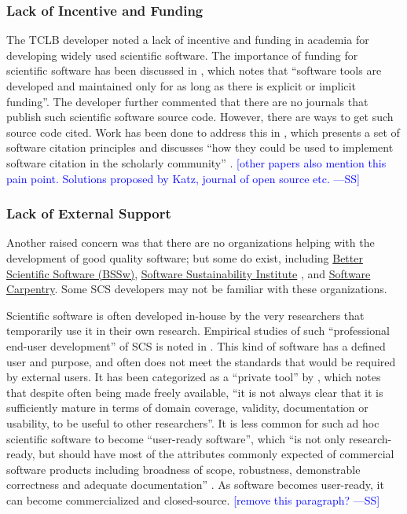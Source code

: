\documentclass[final, 3p, times, authoryear]{elsarticle}
\newcommand{\authornote}[3]{\textcolor{#1}{[#3 ---#2]}}
\newcommand{\authornote}[3]{}
\newcommand{\wss}[1]{\authornote{blue}{SS}{#1}} %
\begin{document}
\subsubsection{Lack of Incentive and Funding}

The TCLB developer noted a lack of incentive and funding in academia for
developing widely used scientific software. The importance of funding for
scientific software has been discussed in \cite{gewaltig2012quality}, which
notes that ``software tools are developed and maintained only for as long as
there is explicit or implicit funding''. The developer further commented that
there are no journals that publish such scientific software source code.
However, there are ways to get such source code cited. Work has been done to
address this in \citep{smith2016software}, which presents a set of software
citation principles and discusses ``how they could be used to implement software
citation in the scholarly community'' \citep{katz2019software}.  \wss{other
papers also mention this pain point.  Solutions proposed by Katz, journal of
open source etc.}

\subsubsection{Lack of External Support}

Another raised concern was that there are no organizations helping with the
development of good quality software; but some do exist, including
\href{https://bssw.io/}{Better Scientific Software (BSSw)},
\href{https://www.software.ac.uk/}{Software Sustainability Institute}
\citep{CrouchEtAl2013}, and \href{https://software-carpentry.org/}{Software
Carpentry}. Some SCS developers may not be familiar with these organizations.
\citep{WilsonAndLumsdaine2006}

Scientific software is often developed in-house by the very researchers that
temporarily use it in their own research. Empirical studies of such
``professional end-user development'' of SCS is noted in \citep{segal2007end}.
This kind of software has a defined user and purpose, and often does not meet
the standards that would be required by external users. It has been categorized
as a ``private tool'' by \citep{gewaltig2012quality}, which notes that despite
often being made freely available, ``it is not always clear that it is
sufficiently mature in terms of domain coverage, validity, documentation or
usability, to be useful to other researchers''. It is less common for such ad
hoc scientific software to become ``user-ready software'', which ``is not only
research-ready, but should have most of the attributes commonly expected of
commercial software products including broadness of scope, robustness,
demonstrable correctness and adequate documentation''
\citep{gewaltig2012quality}. As software becomes user-ready, it can become
commercialized and closed-source.  \wss{remove this paragraph?}
\end{document}
